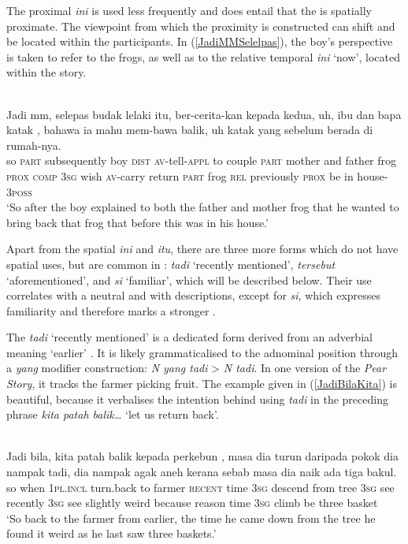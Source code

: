 \documentclass[output=paper
,modfonts
,nonflat]{langsci/langscibook}
\begin{document}
\noindent
The proximal \emph{ini} is used less frequently and does entail that the  is spatially proximate. The viewpoint from which the proximity is constructed can shift and be located within the participants. In (\ref{JadiMMSelelpas}), the boy's perspective is taken to refer to the frogs, as well as to the relative temporal \emph{ini} `now', located within the story.

\ea\label{JadiMMSelelpas} 
\\
\gll 	Jadi mm,       selepas      {budak lelaki} itu, ber-cerita-kan      kepada kedua, uh,    {\ob}ibu    dan  bapa katak , bahawa ia     mahu mem-bawa balik, uh    katak yang sebelum  berada di rumah-nya.\\
so   \textsc{part} subsequently boy   \textsc{dist}  \textsc{av-}tell-\textsc{appl}    to     couple \textsc{part} mother and  father frog  \textsc{prox} \textsc{comp}   \textsc{3sg} wish \textsc{av-}carry   return \textsc{part} frog  \textsc{rel}  previously \textsc{prox}  be     in house-\textsc{3poss}\\
\glt `So after the boy explained to both the father and mother frog that he wanted to bring back that frog that before this was in his house.'
\z

\noindent
Apart from the spatial \emph{ini} and \emph{itu}, there are three more  forms which do not have spatial uses, but are common in : \emph{tadi} `recently mentioned', \emph{tersebut} `aforementioned', and \emph{si} `familiar', which will be described below. Their use correlates with a neutral  and  with descriptions, except for \emph{si}, which expresses familiarity and therefore marks a stronger .

The  \emph{tadi} `recently mentioned' is a dedicated  form derived from an adverbial meaning `earlier' \citep[133]{Sneddon2012}. It is likely grammaticalised to the adnominal position through a \emph{yang} modifier construction: \emph{N yang tadi} > \emph{N tadi}. In one version of the \emph{Pear Story}, it tracks the farmer picking fruit. The example given in (\ref{JadiBilaKita}) is beautiful, because it verbalises the intention behind using \emph{tadi} in the preceding phrase \emph{kita patah balik\ldots} `let us return back'.\largerpage

\ea\label{JadiBilaKita} 
\\
\gll Jadi bila, kita {patah balik} kepada  {\ob}perkebun ,    masa dia turun daripada pokok dia nampak tadi,    dia nampak agak      aneh  kerana  sebab masa dia naik  ada      tiga  bakul.\\
so   when  \textsc{1pl.incl}  turn.back   to     farmer   \textsc{recent} time \textsc{3sg} descend from     tree  \textsc{3sg} see    recently \textsc{3sg} see    slightly weird because reason time \textsc{3sg} climb be three basket\\
\glt `So back to the farmer from earlier, the time he came down from the tree he found it weird as he last saw three baskets.'
\z
\end{document}
